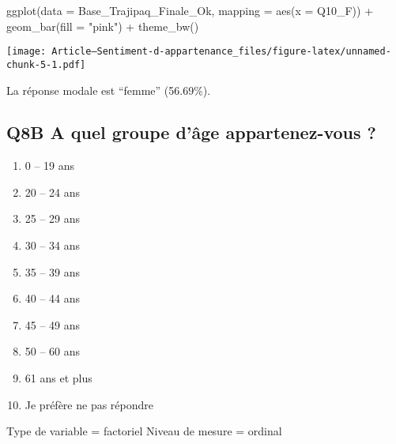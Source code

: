 \documentclass[
]{article}
\newenvironment{Shaded}{\begin{snugshade}}{\end{snugshade}}
\newcommand{\AttributeTok}[1]{\textcolor[rgb]{0.77,0.63,0.00}{#1}}
\newcommand{\FunctionTok}[1]{\textcolor[rgb]{0.00,0.00,0.00}{#1}}
\newcommand{\NormalTok}[1]{#1}
\newcommand{\SpecialCharTok}[1]{\textcolor[rgb]{0.00,0.00,0.00}{#1}}
\newcommand{\StringTok}[1]{\textcolor[rgb]{0.31,0.60,0.02}{#1}}
\providecommand{\tightlist}{%
  \setlength{\itemsep}{0pt}\setlength{\parskip}{0pt}}
\begin{document}
\begin{Shaded}
\begin{Highlighting}[]
\FunctionTok{ggplot}\NormalTok{(}\AttributeTok{data =}\NormalTok{ Base\_Trajipaq\_Finale\_Ok, }\AttributeTok{mapping =} \FunctionTok{aes}\NormalTok{(}\AttributeTok{x =}\NormalTok{ Q10\_F)) }\SpecialCharTok{+}
  \FunctionTok{geom\_bar}\NormalTok{(}\AttributeTok{fill =} \StringTok{"pink"}\NormalTok{) }\SpecialCharTok{+}
  \FunctionTok{theme\_bw}\NormalTok{()}
\end{Highlighting}
\end{Shaded}

\texttt{[image: Article---Sentiment-d-appartenance\_files/figure-latex/unnamed-chunk-5-1.pdf]}

La réponse modale est ``femme'' (56.69\%).

\hypertarget{q8b-a-quel-groupe-duxe2ge-appartenez-vous}{%
\subsection{Q8B A quel groupe d'âge appartenez-vous
?}\label{q8b-a-quel-groupe-duxe2ge-appartenez-vous}}

\begin{enumerate}
\def\labelenumi{\arabic{enumi}.}
\tightlist
\item
  0 -- 19 ans
\item
  20 -- 24 ans
\item
  25 -- 29 ans
\item
  30 -- 34 ans
\item
  35 -- 39 ans
\item
  40 -- 44 ans
\item
  45 -- 49 ans
\item
  50 -- 60 ans
\item
  61 ans et plus
\item
  Je préfère ne pas répondre
\end{enumerate}

Type de variable = factoriel Niveau de mesure = ordinal

\begin{Shaded}
\end{Shaded}
\end{document}
